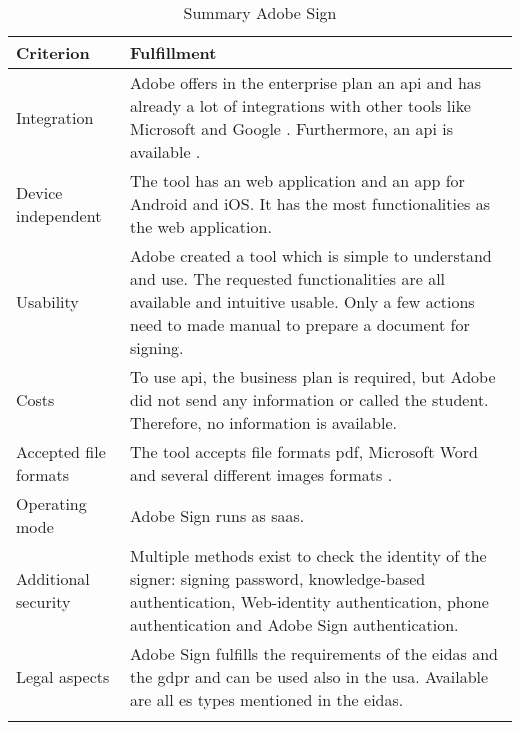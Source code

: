 	\begin{longtable}{|p{4cm}|p{10cm}|} \hline
		Criterion & Fulfillment \\ \hline
		Integration & Adobe offers in the enterprise plan an \gls{api} and has already a lot of integrations with other tools like Microsoft and Google \parencite{adobesign2018integration,adobesign2018info}. Furthermore, an \gls{api} is available \parencite{adobesign2018api}. \\ \hline
		Device independent & The tool has an web application and an \gls{app} for Android and iOS. It has the most functionalities as the web application. \\ \hline
		Usability & Adobe created a tool which is simple to understand and use. The requested functionalities are all available and intuitive usable. Only a few actions need to made manual to prepare a document for signing. \\ \hline
		Costs & To use \gls{api}, the business plan is required, but Adobe did not send any information or called the student. Therefore, no information is available.\\ \hline
		Accepted file formats & The tool accepts file formats \gls{pdf}, Microsoft Word and several different images formats \parencite{adobesign2018info}. \\ \hline
		Operating mode & Adobe Sign runs as \gls{saas}. \parencite{adobesign2016} \\ \hline
		Additional security & Multiple methods exist to check the identity of the signer: signing password, knowledge-based authentication, Web-identity authentication, phone authentication and Adobe Sign authentication. \parencite{adobesign2018security} \\ \hline
		Legal aspects & Adobe Sign fulfills the requirements of the \gls{eidas} and the \gls{gdpr} and can be used also in the \gls{usa}. Available are all \gls{es} types mentioned in the \gls{eidas}. \parencite{adobesign2018legal,adobesign2018gdpr, adobesign2018es}\\ \hline
	\caption{Summary Adobe Sign}
	\label{tab:adobesign}
	\end{longtable}

